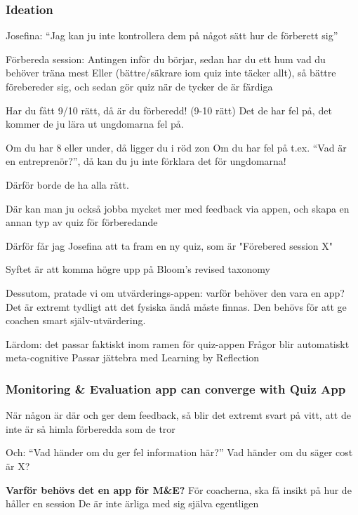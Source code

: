 \subsubsection*{Ideation}

Josefina: “Jag kan ju inte kontrollera dem på något sätt hur de förberett sig”

Förbereda session:
Antingen inför du börjar, sedan har du ett hum vad du behöver träna mest
Eller (bättre/säkrare iom quiz inte täcker allt), så bättre förebereder sig, och sedan gör quiz när de tycker de är färdiga

Har du fått 9/10 rätt, då är du förberedd! (9-10 rätt)
Det de har fel på, det kommer de ju lära ut ungdomarna fel på.

Om du har 8 eller under, då ligger du i röd zon
Om du har fel på t.ex. “Vad är en entreprenör?”, då kan du ju inte förklara det för ungdomarna!

Därför borde de ha alla rätt.

Där kan man ju också jobba mycket mer med feedback via appen, och skapa en annan typ av quiz för förberedande

Därför får jag Josefina att ta fram en ny quiz, som är "Förebered session X"


Syftet är att komma högre upp på Bloom's revised taxonomy

Dessutom, pratade vi om utvärderings-appen: varför behöver den vara en app? Det är extremt tydligt att det fysiska ändå måste finnas. Den behövs för att ge coachen smart själv-utvärdering.

Lärdom: det passar faktiskt inom ramen för quiz-appen
Frågor blir automatiskt meta-cognitive
Passar jättebra med Learning by Reflection

\subsubsection{Monitoring \& Evaluation app can converge with Quiz App}
När någon är där och ger dem feedback, så blir det extremt svart på vitt, att de inte är så himla förberedda som de tror

Och: “Vad händer om du ger fel information här?” Vad händer om du säger cost är X?

\textbf{Varför behövs det en app för M\&E?}
För coacherna, ska få insikt på hur de håller en session
De är inte ärliga med sig själva egentligen

